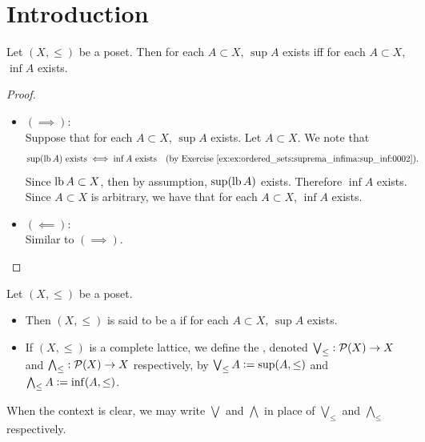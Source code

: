 \documentclass{book}
\begin{document}
	\section{Introduction}
	
	\begin{ex}
		Let $(X, \leq)$ be a poset. Then for each $A \subset X$, $\sup A$ exists iff for each $A \subset X$, $\inf A$ exists. 
	\end{ex}
	
	\begin{proof}\
		\begin{itemize}
			\item $(\implies)$: \\
			Suppose that for each $A \subset X$, $\sup A$ exists. Let $A \subset X$. We note that 
			\begin{align*}
				\text{$\sup (\lbd A)$ exists}
				& \iff  \text{$\inf A$ exists} \quad \text{(by \rex{ex:ordered_sets:suprema_infima:sup_inf:0002})}.
			\end{align*}
			Since $\operatorname{lb} A \subset X$, then by assumption, $\sup (\operatorname{lb} A)$ exists. Therefore $\inf A$ exists. Since $A \subset X$ is arbitrary, we have that for each $A \subset X$, $\inf A$ exists.
			\item $(\impliedby)$: \\
			Similar to $(\implies)$.
		\end{itemize}
	\end{proof}
	
	\begin{defn}
		Let $(X, \leq)$ be a poset. 
		\begin{itemize}
			\item Then $(X, \leq)$ is said to be a  if for each $A \subset X$, $\sup A$ exists. 
			\item If $(X, \leq)$ is a complete lattice, we define the , denoted $\bigvee_{\leq} : \mathcal{P}(X) \rightarrow X$ and $\bigwedge_{\leq} : \mathcal{P}(X) \rightarrow X$ respectively, by $\bigvee_{\leq} A \vcentcolon= \sup (A, \leq)$ and $\bigwedge_{\leq} A \vcentcolon= \inf (A, \leq)$. 
		\end{itemize}
	\end{defn}
	
	\begin{note}
		When the context is clear, we may write $\bigvee$ and $\bigwedge$ in place of $\bigvee_{\leq}$ and $\bigwedge_{\leq}$ respectively.
	\end{note}
	
\end{document}
